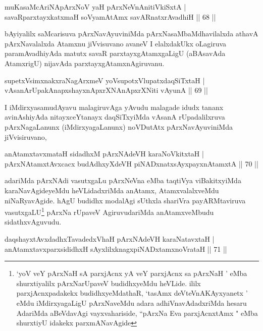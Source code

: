 
\begin{shl}
muKasaMcAriNA\s pArxNoV yaH pArxNeVnAnitiVkiSxtA |\\
savaRparxtayxkatxmaH soV\s yamAtAmx savARnatxrAvadhiH \hfill || 68 ||
\end{shl}

\begin{artha}
bAyiyalilx saMcarisuva pArxNavAyuviniMda pArxNasaMbaMdhavilalxda athavA pArxNavalalxda Atamxnu jiVvisuvano avaneV I elalxdakUkx oLagiruva paramAvadhiyAda matutx savaR parxtayxgAtamxgaLigU (aBAsavAda AtamxrigU) nijavAda parxtayxgAtamxnAgiruvanu.
\end{artha}

\begin{shl}
supetxV\s simxnakxraNagArxmeV yoV\s supotxV\s lupatxdaqSiTxtaH |\\
vAsanArUpakAnapxshayxnApxrXNAnApxrXNiti vAyunA \hfill || 69 ||
\end{shl}

\begin{artha}
I iMdirxyasamudAyavu malagiruvAga yAvudu malagade idudx tananx avinAshiyAda nitayxceYtanayx daqSiTxyiMda vAsanA rUpadalilx\-\break ruva pArxNagaLanunx (iMdirxyagaLanunx) noVDutAtx pArxNavAyu\-\break viniMda jiVvisiruvano,
\end{artha}

\begin{shl}
anAtamxtavxmataH sidadhxM pArxNAdeVH karaNoVkitxtaH |\\
pArxNAtamxtAvxcacx budAdhxyXdeVH piNADxnatxsAyxpayxnAtamxtA \hfill || 70 ||
\end{shl}

\begin{artha}
adariMda pArxNAdi vasutxgaLu pArxNeVna eMba taqtiVya viBakitxyiMda karaNavAgideyeMdu heVLidadxriMda anAtamx, AtamxvalalxveMdu niNaRyavAgide. hAgU budidhx modalAgi sUthxla shariVra payARMtaviruva vasutxgaLU\footnote{`yoV veY pArxNaH sA parxjAcnx yA veY parxjAcnx sa pArxNaH ' eMba shurxtiyalilx pArxNarUpaveV budidhxyeMdu heVLide. ililx parxjAcnxpadakekx budidhxyeMdathaR, `tasAmx deVteVnAKAyxyanetx ' eMdu iMdirxyagaLigU pArxNaveMdu adara adhiVnavAdadxriMda hesaru AdariMda aBeVdavAgi vayxvahariside, ``pArxNa Eva parxjAcnxtAmx " eMba shurxtiyU idakekx parxmANavAgide} pArxNa rUpaveV AgiruvudariMda anAtamxveMbudu sidathxvAguvudu.
\end{artha}%

\begin{shl}
daqshayxtAvxdadhxTavadedxVhaH pArxNAdeVH karaNatavxtaH |\\
anAtamxtavxparxsididhxH sAyxlilxknagxpiNADxtamxnoVrataH \hfill || 71 ||
\end{shl}

